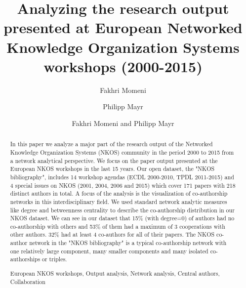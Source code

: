 \documentclass[runningheads,a4paper]{llncs}
\newcommand{\keywords}[1]{\par\addvspace\baselineskip
\noindent\keywordname\enspace\ignorespaces#1}
\begin{document}
\mainmatter  %

\title{Analyzing the research output presented at European Networked Knowledge Organization Systems workshops (2000-2015)}



%
%
\author{Fakhri Momeni%
	\and Philipp Mayr}
%

\author{Fakhri Momeni and Philipp Mayr}

%
%

\maketitle


\begin{abstract}		
In this paper we analyze a major part of the research output of the Networked Knowledge Organization Systems (NKOS) community in the period 2000 to 2015 from a network analytical perspective. We focus on the paper output presented at the European NKOS workshops in the last 15 years. Our open dataset, the "NKOS bibliography", includes 14 workshop agendas (ECDL 2000-2010, TPDL 2011-2015) and 4 special issues on NKOS (2001, 2004, 2006 and 2015) which cover 171 papers with 218 distinct authors in total. A focus of the analysis is the visualization of co-authorship networks in this interdisciplinary field. We used standard network analytic measures like degree and betweenness centrality to describe the co-authorship distribution in our NKOS dataset.  We can see in our dataset that 15\% (with degree=0) of authors had no co-authorship with others and 53\% of them had a maximum of 3 cooperations with other authors. 32\% had at least 4 co-authors for all of their papers. The NKOS co-author network in the "NKOS bibliography" is a typical co-authorship network with one relatively large component, many smaller components and many isolated co-authorships or triples.

 
\keywords{European NKOS workshops, Output analysis, Network analysis, Central authors, Collaboration}
\end{abstract}
\end{document}
